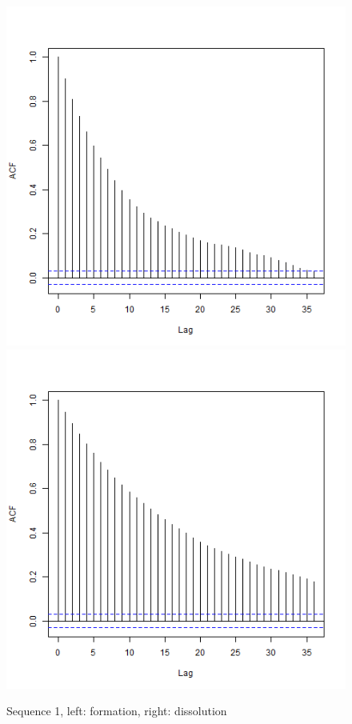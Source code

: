 \documentclass[aspectratio=169,ignorenonframetext,9pt]{beamer}
\theoremstyle{plain}
\theoremstyle{definition}
\begin{document}
\begin{figure}[h]
\begin{center}
        \includegraphics[scale=0.23]{pictures/net1seq_chain1_BSTERGM_formation_acf.png}
        \includegraphics[scale=0.23]{pictures/net1seq_chain1_BSTERGM_dissolution_acf.png}
    \caption{Sequence 1, left: formation, right: dissolution}
    \end{center}
\end{figure}
\end{document}
